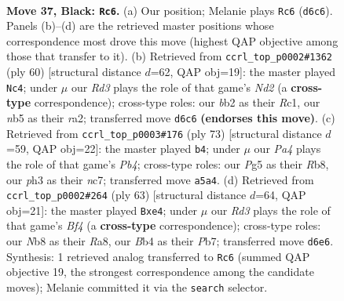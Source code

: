 \documentclass[11pt]{article}
\begin{document}
\clearpage

\begin{figure}[p]\centering
\begin{subfigure}{0.46\textwidth}\centering
\resizebox{\linewidth}{!}{%
\newchessgame
\chessboard[
  setfen={1nb2k2/1p6/1n1r1p2/pN1p2p1/1b4Pp/1P2P2P/PB2PK2/2RB4 b - - 9 37},
  showmover=false,
  pgfstyle=straightmove, color=movearrow, markmove={d6-c6}
]}
\caption{}
\end{subfigure}\hfill
\begin{subfigure}{0.46\textwidth}\centering
\resizebox{\linewidth}{!}{%
\newchessgame
\chessboard[
  setfen={4r3/1p2p1bk/3p2pp/2PP1p2/1P3B1P/1R4P1/r2NbP2/2R3K1 w - - 1 31},
  showmover=false,
  pgfstyle=straightmove, color=movearrow, markmove={d2-c4}
]}
\caption{}
\end{subfigure}
\\[4pt]
\begin{subfigure}{0.46\textwidth}\centering
\resizebox{\linewidth}{!}{%
\newchessgame
\chessboard[
  setfen={1r3bk1/2NRnp2/7p/1pp3p1/p1b1BPP1/P3P2P/1P4K1/2B5 b - - 3 37},
  showmover=false,
  pgfstyle=straightmove, color=movearrow, markmove={b5-b4}
]}
\caption{}
\end{subfigure}\hfill
\begin{subfigure}{0.46\textwidth}\centering
\resizebox{\linewidth}{!}{%
\newchessgame
\chessboard[
  setfen={r7/1p1n1k1p/2p2pp1/p4b2/P1P1BP2/1P2B1K1/3R2PP/8 b - - 5 32},
  showmover=false,
  pgfstyle=straightmove, color=movearrow, markmove={f5-e4}
]}
\caption{}
\end{subfigure}
\caption{\textbf{Move 37, Black: \texttt{Rc6}.} (a) Our position; Melanie plays \texttt{Rc6} (\texttt{d6c6}). Panels (b)--(d) are the retrieved master positions whose correspondence most drove this move (highest QAP objective among those that transfer to it). (b) Retrieved from \texttt{ccrl\_top\_p0002\#1362} (ply 60) [structural distance $d$=62, QAP obj=19]: the master played \texttt{Nc4}; under $\mu$ our \emph{Rd3} plays the role of that game's \emph{Nd2} (a \textbf{cross-type} correspondence); cross-type roles: our \emph{b}b2 as their \emph{R}c1, our \emph{n}b5 as their \emph{r}a2; transferred move \texttt{d6c6} \textbf{(endorses this move)}. (c) Retrieved from \texttt{ccrl\_top\_p0003\#176} (ply 73) [structural distance $d$=59, QAP obj=22]: the master played \texttt{b4}; under $\mu$ our \emph{Pa4} plays the role of that game's \emph{Pb4}; cross-type roles: our \emph{P}g5 as their \emph{R}b8, our \emph{p}h3 as their \emph{n}c7; transferred move \texttt{a5a4}. (d) Retrieved from \texttt{ccrl\_top\_p0002\#264} (ply 63) [structural distance $d$=64, QAP obj=21]: the master played \texttt{Bxe4}; under $\mu$ our \emph{Rd3} plays the role of that game's \emph{Bf4} (a \textbf{cross-type} correspondence); cross-type roles: our \emph{N}b8 as their \emph{R}a8, our \emph{B}b4 as their \emph{P}b7; transferred move \texttt{d6e6}. Synthesis: 1 retrieved analog transferred to \texttt{Rc6} (summed QAP objective 19, the strongest correspondence among the candidate moves); Melanie committed it via the \texttt{search} selector.}
\label{fig:thought-m73}
\end{figure}
\end{document}
